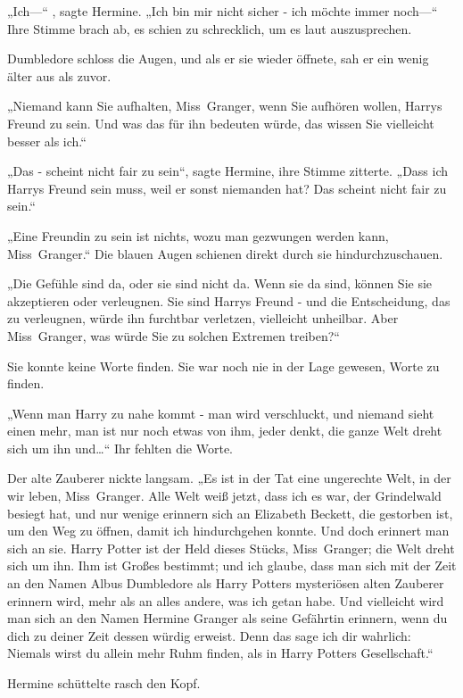 {„Ich—“ , sagte Hermine. „Ich bin mir nicht sicher - ich möchte immer noch—“ Ihre Stimme brach ab, es schien zu schrecklich, um es laut auszusprechen.

Dumbledore schloss die Augen, und als er sie wieder öffnete, sah er ein wenig älter aus als zuvor.

„Niemand kann Sie aufhalten, Miss~Granger, wenn Sie aufhören wollen, Harrys Freund zu sein. Und was das für ihn bedeuten würde, das wissen Sie vielleicht besser als ich.“

„Das - scheint nicht fair zu sein“, sagte Hermine, ihre Stimme zitterte. „Dass ich Harrys Freund sein muss, weil er sonst niemanden hat? Das scheint nicht fair zu sein.“

„Eine Freundin zu sein ist nichts, wozu man gezwungen werden kann, Miss~Granger.“ Die blauen Augen schienen direkt durch sie hindurchzuschauen.

„Die Gefühle sind da, oder sie sind nicht da. Wenn sie da sind, können Sie sie akzeptieren oder verleugnen. Sie sind Harrys Freund - und die Entscheidung, das zu verleugnen, würde ihn furchtbar verletzen, vielleicht unheilbar. Aber Miss~Granger, was würde Sie zu solchen Extremen treiben?“

Sie konnte keine Worte finden. Sie war noch nie in der Lage gewesen, Worte zu finden.

„Wenn man Harry zu nahe kommt - man wird verschluckt, und niemand sieht einen mehr, man ist nur noch etwas von ihm, jeder denkt, die ganze Welt dreht sich um ihn und…“ Ihr fehlten die Worte.

Der alte Zauberer nickte langsam. „Es ist in der Tat eine ungerechte Welt, in der wir leben, Miss~Granger. Alle Welt weiß jetzt, dass ich es war, der Grindelwald besiegt hat, und nur wenige erinnern sich an Elizabeth Beckett, die gestorben ist, um den Weg zu öffnen, damit ich hindurchgehen konnte. Und doch erinnert man sich an sie. Harry Potter ist der Held dieses Stücks, Miss~Granger; die Welt dreht sich um ihn. Ihm ist Großes bestimmt; und ich glaube, dass man sich mit der Zeit an den Namen Albus Dumbledore als Harry Potters mysteriösen alten Zauberer erinnern wird, mehr als an alles andere, was ich getan habe. Und vielleicht wird man sich an den Namen Hermine Granger als seine Gefährtin erinnern, wenn du dich zu deiner Zeit dessen würdig erweist. Denn das sage ich dir wahrlich: Niemals wirst du allein mehr Ruhm finden, als in Harry Potters Gesellschaft.“

Hermine schüttelte rasch den Kopf.

}
